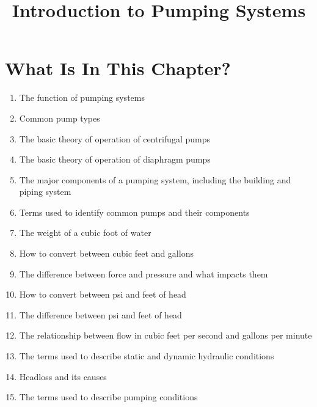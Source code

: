 \documentclass[10pt]{article}
\title{Introduction to Pumping Systems }
\author{}
\date{}
\begin{document}
\maketitle
\section{What Is In This Chapter?}
\begin{enumerate}
  \item The function of pumping systems

  \item Common pump types

  \item The basic theory of operation of centrifugal pumps

  \item The basic theory of operation of diaphragm pumps

  \item The major components of a pumping system, including the building and piping system

  \item Terms used to identify common pumps and their components

  \item The weight of a cubic foot of water

  \item How to convert between cubic feet and gallons

  \item The difference between force and pressure and what impacts them

  \item How to convert between psi and feet of head

  \item The difference between psi and feet of head

  \item The relationship between flow in cubic feet per second and gallons per minute

  \item The terms used to describe static and dynamic hydraulic conditions

  \item Headloss and its causes

  \item The terms used to describe pumping conditions

\end{enumerate}
\end{document}
